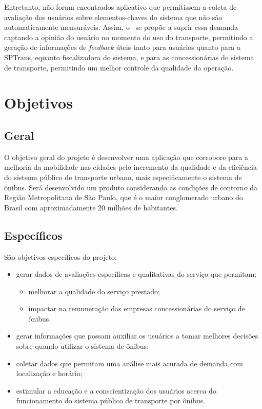 Entretanto, não foram encontrados aplicativo que permitissem a coleta de avaliação dos usuários sobre elementos-chaves do sistema que não são automaticamente mensuráveis. Assim, o \trilhasp~se propõe a suprir essa demanda captando a opinião do usuário no momento do uso do transporte, permitindo a geração de informações de \textit{feedback} úteis tanto para usuários quanto para a SPTrans, equanto fiscalizadora do sistema, e para as concessionárias do sistema de transporte, permitindo um melhor controle da qualidade da operação.

\section{Objetivos}\label{sec:objetivos}
\subsection{Geral}\label{subsec:objGerais}
O objetivo geral do projeto é desenvolver uma aplicação que corrobore para a melhoria da mobilidade nas cidades pelo incremento da qualidade e da eficiência do sistema público de transporte urbano, mais especificamente o sistema de ônibus. Será desenvolvido um produto considerando as condições de contorno da Região Metropolitana de São Paulo, que é o maior conglomerado urbano do Brasil com aproximadamente 20 milhões de habitantes.

\clearpage
\subsection{Específicos}\label{subsec:objEspec}
São objetivos específicos do projeto:
\begin{itemize}
\item gerar dados de avaliações específicas e qualitativas do serviço que permitam: \begin{itemize}
\item melhorar a qualidade do serviço prestado;
\item impactar na remuneração das empresas concessionárias do serviço de ônibus.
\end{itemize}
\item gerar informações que possam auxiliar os usuários a tomar melhores decisões sobre quando utilizar o sistema de ônibus;
\item coletar dados que permitam uma análise mais acurada de demanda com localização e horário;
\item estimular a educação e a conscientização dos usuários acerca do funcionamento do sistema público de transporte por ônibus.
\end{itemize}
	
